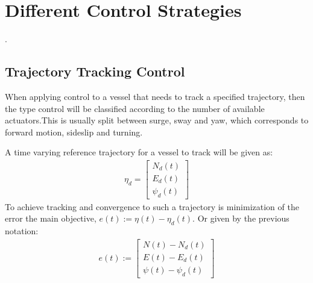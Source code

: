 \chapter{Different Control Strategies}

.


\section{Trajectory Tracking Control}
When applying control to a vessel that needs to track a specified trajectory, then the type control will be classified according to the number of available actuators.This is usually split between surge, sway and yaw, which corresponds to forward motion, sideslip and turning.

A time varying reference trajectory for a vessel to track will be given as:
\begin{align}
\eta_d=
\begin{bmatrix}
N_d(t)\\
E_d(t)\\
\psi_d(t)
\end{bmatrix}
\end{align}
To achieve tracking and convergence to such a trajectory is minimization of the error the main objective, $e(t):=\eta(t)-\eta_d(t)$. Or given by the previous notation:
\begin{align}
e(t):=
\begin{bmatrix}
N(t)-N_d(t)\\
E(t)-E_d(t)\\
\psi(t)-\psi_d(t)
\end{bmatrix}
\end{align}

